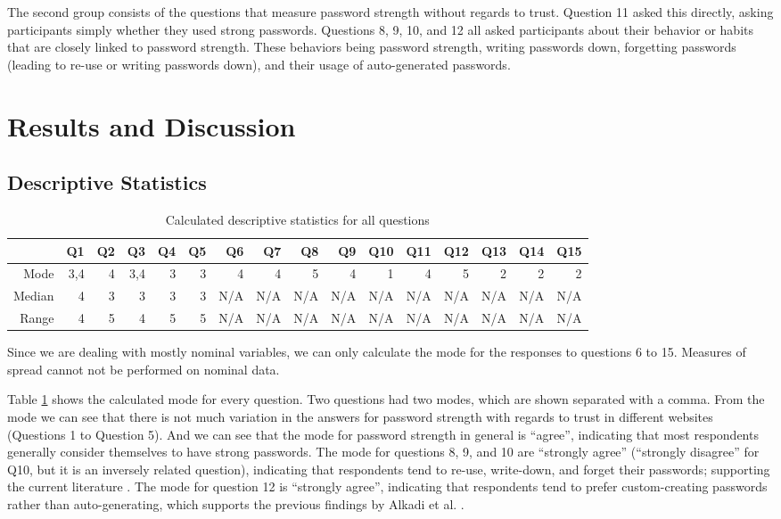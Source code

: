 \documentclass[letterpaper, 10 pt, conference]{ieeeconf}  %
\begin{document}
The second group consists of the questions that measure password strength without regards to trust. Question 11 asked this directly, asking participants simply whether they used strong passwords. Questions 8, 9, 10, and 12 all asked participants about their behavior or habits that are closely linked to password strength. These behaviors being password strength, writing passwords down, forgetting passwords (leading to re-use or writing passwords down), and their usage of auto-generated passwords.

\section{Results and Discussion}

\subsection{Descriptive Statistics}

\begin{table}[h]
\caption{Calculated descriptive statistics for all questions}
\label{tab:desc}
\begin{center}
\begin{tabular}{rrrrrrrrrrrrrrrr}
\hline
      & Q1  & Q2 & Q3  & Q4 & Q5 & Q6  & Q7  & Q8  & Q9  & Q10 & Q11 & Q12 & Q13 & Q14 & Q15 \\ \hline
Mode   & 3,4 & 4  & 3,4 & 3  & 3  & 4   & 4   & 5   & 4   & 1   & 4   & 5   & 2   & 2   & 2   \\ \hline
Median & 4   & 3  & 3   & 3  & 3  & N/A & N/A & N/A & N/A & N/A & N/A & N/A & N/A & N/A & N/A \\ \hline
Range  & 4   & 5  & 4   & 5  & 5  & N/A & N/A & N/A & N/A & N/A & N/A & N/A & N/A & N/A & N/A \\ \hline
\end{tabular}
\end{center}
\end{table}

Since we are dealing with mostly nominal variables, we can only calculate the mode for the responses to questions 6 to 15. Measures of spread cannot not be performed on nominal data. 

Table \ref{tab:desc} shows the calculated mode for every question. Two questions had two modes, which are shown separated with a comma. From the mode we can see that there is not much variation in the answers for password strength with regards to trust in different websites (Questions 1 to Question 5). And we can see that the mode for password strength in general is “agree”, indicating that most respondents generally consider themselves to have strong passwords. The mode for questions 8, 9, and 10 are “strongly agree” (“strongly disagree” for Q10, but it is an inversely related question), indicating that respondents tend to re-use, write-down, and forget their passwords; supporting the current literature \cite{Brown2004}. The mode for question 12 is “strongly agree”, indicating that respondents tend to prefer custom-creating passwords rather than auto-generating, which supports the previous findings by Alkadi et al. \cite{Alkadi2016}.
\end{document}
